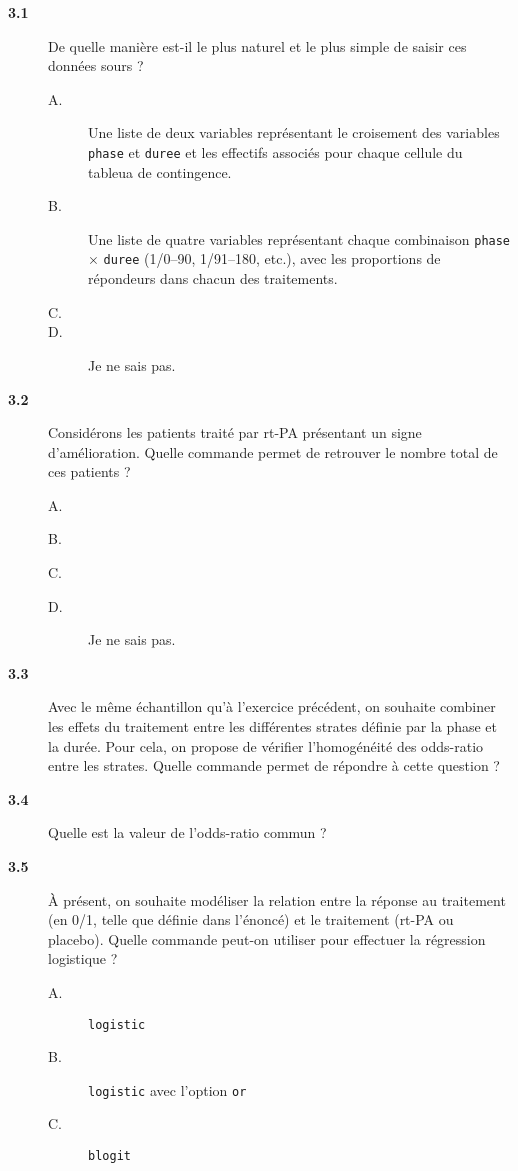 \begin{description}
\item[\bf 3.1] De quelle manière est-il le plus naturel et le plus simple de
  saisir ces données sours \Stata ? 
\begin{description}
\item[A.] Une liste de deux variables représentant le croisement des
  variables \texttt{phase} et \texttt{duree} et les effectifs associés pour
  chaque cellule du tableua de contingence.
\item[B.] Une liste de quatre variables représentant chaque combinaison
  \texttt{phase} $\times$ \texttt{duree} (1/0–90, 1/91–180, etc.), avec les
  proportions de répondeurs dans chacun des traitements.
\item[C.] 
\item[D.] Je ne sais pas.
\end{description}
\item[\bf 3.2] Considérons les patients traité par rt-PA présentant un signe
  d'amélioration. Quelle commande permet de retrouver le nombre total de ces
  patients ? 
\begin{description}
\item[A.] \verb||
\item[B.] \verb||
\item[C.] \verb||
\item[D.] Je ne sais pas.
\end{description}
\item[\bf 3.3] Avec le même échantillon qu'à l'exercice précédent, on
  souhaite combiner les effets du traitement entre les différentes strates
  définie par la phase et la durée. Pour cela, on propose de vérifier
  l'homogénéité des odds-ratio entre les strates. Quelle commande permet de
  répondre à cette question ?  
\item[\bf 3.4] Quelle est la valeur de l'odds-ratio commun ? 
\item[\bf 3.5] À présent, on souhaite modéliser la relation entre la réponse
  au traitement (en 0/1, telle que définie dans l'énoncé) et le traitement
  (rt-PA ou placebo). Quelle commande peut-on utiliser pour effectuer la
  régression logistique ? 
\begin{description}
\item[A.] \verb|logistic|
\item[B.] \verb|logistic| avec l'option \texttt{or}
\item[C.] \verb|blogit|

\end{description}
\end{description}
